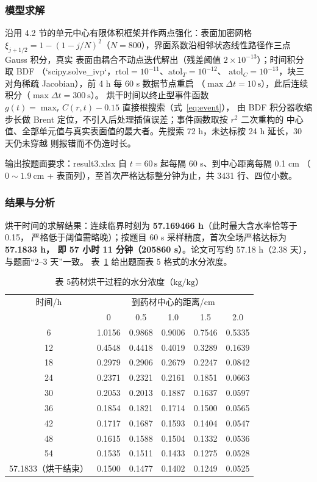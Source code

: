 \subsubsection{模型求解}

沿用 4.2 节的单元中心有限体积框架并作两点强化：表面加密网格
$\xi_{j+1/2}=1-(1-j/N)^2$（$N=800$），界面系数沿相邻状态线性路径作三点 Gauss 积分，真实
表面由耦合不动点迭代解出（残差阈值 $2\times10^{-13}$）；时间积分取 BDF
（`scipy.solve_ivp`，$\mathrm{rtol}=10^{-11}$、$\mathrm{atol}_T=10^{-12}$、
$\mathrm{atol}_C=10^{-13}$，块三对角稀疏 Jacobian），前 4 h 每 60 s 数据节点重启
（$\max\Delta t=10\ \mathrm{s}$），此后连续积分（$\max\Delta t=300\ \mathrm{s}$）。
烘干时间以终止型事件函数 $g(t)=\max_r C(r,t)-0.15$ 直接根搜索（式~\eqref{eq:event}），
由 BDF 积分器收缩步长做 Brent 定位，不引入后处理插值误差；事件函数取按 $r^2$ 二次重构的
中心值、全部单元值与真实表面值的最大者。先搜索 72 h，未达标按 24 h 延长，30 天仍未穿越
则报错而不伪造时长。

输出按题面要求：result3.xlsx 自 $t=60\,\mathrm{s}$ 起每隔 60 s、到中心距离每隔 0.1 cm
（$0\sim1.9\ \mathrm{cm}$ + 表面列），至首次严格达标整分钟为止，共 3431 行、四位小数。

\subsubsection{结果与分析}

烘干时间的求解结果：连续临界时刻为 \textbf{57.169466 h}（此时最大含水率恰等于 0.15，
严格低于阈值需略晚）；按题目 60 s 采样精度，首次全场严格达标为 \textbf{57.1833 h，
即 57 小时 11 分钟（205860 s）}。论文可写约 57.18 h（2.38 天），与题面“2–3 天”一致。
表~\ref{tab:C5} 给出题面表 5 格式的水分浓度。

\begin{table}[htbp]
  \centering
  \caption{表 5\quad 药材烘干过程的水分浓度（$\mathrm{kg/kg}$）}
  \label{tab:C5}
  \begin{tabular}{cccccc}
    \hline
    时间/h & \multicolumn{5}{c}{到药材中心的距离/cm} \\
    & 0 & 0.5 & 1.0 & 1.5 & 2.0 \\
    \hline
    6  & 1.0156 & 0.9868 & 0.9006 & 0.7546 & 0.5335 \\
    12 & 0.4548 & 0.4418 & 0.4019 & 0.3289 & 0.1639 \\
    18 & 0.2979 & 0.2906 & 0.2679 & 0.2247 & 0.0842 \\
    24 & 0.2371 & 0.2321 & 0.2161 & 0.1851 & 0.0663 \\
    30 & 0.2053 & 0.2013 & 0.1887 & 0.1637 & 0.0597 \\
    36 & 0.1854 & 0.1821 & 0.1714 & 0.1500 & 0.0565 \\
    42 & 0.1717 & 0.1687 & 0.1593 & 0.1404 & 0.0547 \\
    48 & 0.1615 & 0.1588 & 0.1504 & 0.1332 & 0.0536 \\
    54 & 0.1535 & 0.1511 & 0.1433 & 0.1275 & 0.0528 \\
    57.1833（烘干结束） & 0.1500 & 0.1477 & 0.1402 & 0.1249 & 0.0525 \\
    \hline
  \end{tabular}
\end{table}

